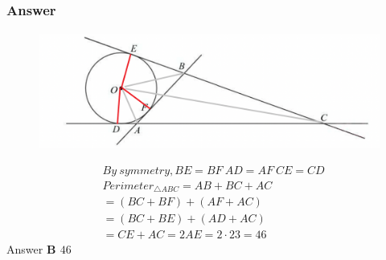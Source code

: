 \documentclass[
	11pt, %
]{beamer}
\begin{document}

\begin{frame}
	\frametitle{Answer}
	\framesubtitle{}
			\begin{figure}
				\includegraphics[width=0.7\linewidth]{Tangent_Example_Question2_1.png}
			\end{figure}
			\pause
	     \begin{equation*}
					\begin{aligned}
					&By\ symmetry, BE = BF\ AD = AF\ CE = CD\\
					&Perimeter_{\triangle ABC} = AB + BC + AC\\
					&=(BC + BF) + (AF + AC)\\
					&=(BC + BE) + (AD + AC)\\
					&=CE + AC = 2AE = 2\cdot 23 = 46
					\end{aligned}
				\end{equation*}					
			\pause
			Answer \textbf{B $46$}
\end{frame}

\end{document}
